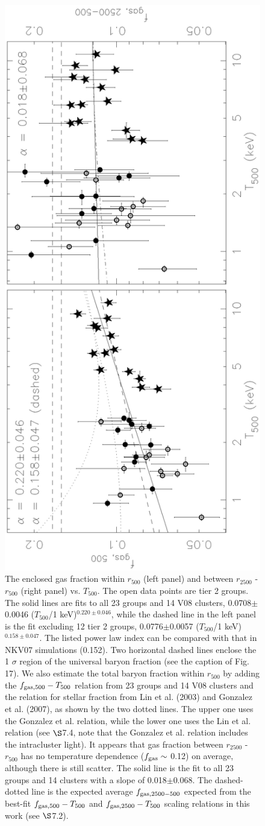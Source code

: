 \documentclass{aastex}
\begin{document}
\begin{figure}
\centerline{\includegraphics[height=1.0\linewidth,angle=270]{f19.ps}}
  \caption{The enclosed gas fraction within $r_{500}$ (left panel) and between
$r_{2500}$ - $r_{500}$ (right panel) vs. $T_{500}$. The open data points are tier 2 groups.
The solid lines are fits to all 23 groups and 14 V08 clusters, 0.0708$\pm$0.0046
($T_{500}$/1 keV)$^{0.220\pm0.046}$, while the dashed line in the left panel is
the fit excluding 12 tier 2 groups, 0.0776$\pm$0.0057 ($T_{500}$/1 keV)$^{0.158\pm0.047}$.
The listed power law index can be compared with that in NKV07 simulations
(0.152). Two horizontal dashed lines enclose the 1 $\sigma$ region of the
universal baryon fraction (see the caption of Fig. 17). We also estimate
the total baryon fraction within $r_{500}$ by adding the $f_{\rm gas, 500} - T_{500}$
relation from 23 groups and 14 V08 clusters and the relation for stellar fraction
from Lin et al. (2003) and Gonzalez et al. (2007), as shown by the two dotted
lines. The upper one uses the Gonzalez et al. relation, while the lower one
uses the Lin et al. relation (see $\S$7.4, note that the  Gonzalez et al. relation
includes the intracluster light). It appears that gas fraction between
$r_{2500}$ - $r_{500}$ has no temperature dependence ($f_{\rm gas} \sim$ 0.12)
on average, although there is still scatter. The solid line is the fit to all
23 groups and 14 clusters with a slope of 0.018$\pm$0.068. The dashed-dotted line
is the expected average $f_{\rm gas, 2500-500}$ expected from the best-fit
$f_{\rm gas, 500} - T_{500}$ and $f_{\rm gas, 2500} - T_{500}$
scaling relations in this work (see $\S$7.2).
}
\end{figure}
\end{document}
